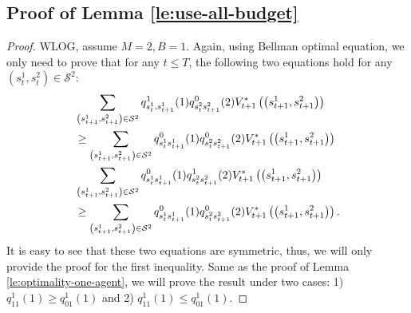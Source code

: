 \subsection{Proof of Lemma \ref{le:use-all-budget}}\label{app:use-all-budget}
\useallbudget*
\begin{proof}
 WLOG, assume $M=2, B=1$. Again, using Bellman optimal equation, we only need to prove that for any $t\leq T$, the following two equations hold for any $\left(s_t^1,s_t^2\right)\in\mathcal{S}^2$:
    \begin{align}
      &   \sum_{\left(s_{t+1}^1,s_{t+1}^2\right)\in\mathcal{S}^2}q^1_{s_t^1,s_{t+1}^1}(1)q^0_{s_t^2s_{t+1}^2}(2)V_{t+1}^*\left(\left(s_{t+1}^1,s_{t+1}^2\right)\right)\notag\\&\geq\sum_{\left(s_{t+1}^1,s_{t+1}^2\right)\in\mathcal{S}^2}q^0_{s_t^1s_{t+1}^1}(1)q^0_{s_t^2s_{t+1}^2}(2)V_{t+1}^*\left(\left(s_{t+1}^1,s_{t+1}^2\right)\right)\\
&\sum_{\left(s_{t+1}^1,s_{t+1}^2\right)\in\mathcal{S}^2}q^0_{s_t^1s_{t+1}^1}(1)q^1_{s_t^2s_{t+1}^2}(2)V_{t+1}^*\left(\left(s_{t+1}^1,s_{t+1}^2\right)\right)\notag\\&\geq\sum_{\left(s_{t+1}^1,s_{t+1}^2\right)\in\mathcal{S}^2}q^0_{s_t^1s_{t+1}^1}(1)q^0_{s_t^2s_{t+1}^2}(2)V_{t+1}^*\left(\left(s_{t+1}^1,s_{t+1}^2\right)\right).
    \end{align}
   It is easy to see that these two equations are symmetric, thus, we will only provide the proof for the first inequality. Same as the proof of Lemma \ref{le:optimality-one-agent}, we will prove the result under two cases: 1)  $q^1_{11}(1)\geq q^1_{01}(1)$ and 2)  $q^1_{11}(1)\leq q^1_{01}(1)$.

\end{proof}

